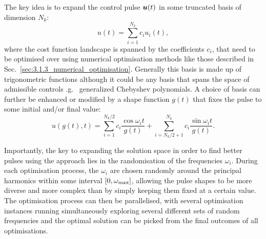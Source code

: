 The key idea is to expand the control pulse $\boldsymbol{u}(t)$ in some truncated basis of dimension $N_k$: 
\begin{equation}\label{eq:basic_CRAB}
    u(t) = \sum_{i = 1}^{N_k} c_i u_i(t),
\end{equation}
where the cost function landscape is spanned by the coefficients $c_i$, that need to be optimised over using numerical optimisation methods like those described in Sec.~\ref{sec:3.1.3_numerical_optimisation}. Generally this basis is made up of trigonometric functions although it could be any basis that spans the space of admissible controls \@e.g.~ generalized Chebyshev polynomials. A choice of basis can further be enhanced or modified by a shape function $g(t)$ that fixes the pulse to some initial and/or final value:
\begin{equation}\label{eq:trigonometric_CRAB}
    u(g(t),t) = \sum_{i = 1}^{N_k/2} c_i \frac{\cos{\omega_i t}}{g(t)} + \sum_{i = N_k/2 + 1}^{N_k} c_i \frac{\sin{\omega_i} t}{g(t)}.
\end{equation}

Importantly, the key to expanding the solution space in order to find better pulses using the  approach lies in the randomisation of the frequencies $\omega_i$. During each optimisation process, the $\omega_i$ are chosen randomly around the principal harmonics within some interval $[0, \omega_{\rm max}]$, allowing the pulse shapes to be more diverse and more complex than by simply keeping them fixed at a certain value. The optimisation process can then be parallelised, with several optimisation instances running simultaneously exploring several different sets of random frequencies and the optimal solution can be picked from the final outcomes of all optimisations. 

